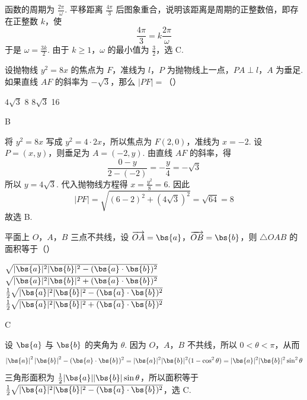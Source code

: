 \begin{solution}
函数的周期为 \(\frac{2\pi}{\omega}\). 平移距离 \(\frac{4\pi}{3}\) 后图象重合，说明该距离是周期的正整数倍，即存在正整数 \(k\)，使
\[
\frac{4\pi}{3}=k\frac{2\pi}{\omega}
\]
于是 \(\omega=\frac{3k}{2}\). 由于 \(k\geqslant1\)，\(\omega\) 的最小值为 \(\frac{3}{2}\)，选 C.
\end{solution}

\begin{problem}
设抛物线 \(y^2=8x\) 的焦点为 \(F\)，准线为 \(l\)，\(P\) 为抛物线上一点，\(PA\perp l\)，\(A\) 为垂足. 如果直线 \(AF\) 的斜率为 \(-\sqrt{3}\)，那么 \(|PF|=\)（\quad）

\choices
    {\(4\sqrt{3}\)}
    {8}
    {\(8\sqrt{3}\)}
    {16}
\end{problem}

\begin{answer}
B
\end{answer}

\begin{solution}
将 \(y^2=8x\) 写成 \(y^2=4\cdot2x\)，所以焦点为 \(F(2,0)\)，准线为 \(x=-2\). 设 \(P=(x,y)\)，则垂足为 \(A=(-2,y)\). 由直线 \(AF\) 的斜率，得
\[
\frac{0-y}{2-(-2)}=-\frac{y}{4}=-\sqrt{3}
\]
所以 \(y=4\sqrt{3}\). 代入抛物线方程得 \(x=\frac{y^2}{8}=6\). 因此
\[
|PF|=\sqrt{(6-2)^2+(4\sqrt{3})^2}=\sqrt{64}=8
\]
故选 B.
\end{solution}

\begin{problem}
平面上 \(O\)，\(A\)，\(B\) 三点不共线，设 \(\overrightarrow{OA}=\bs{a}\)，\(\overrightarrow{OB}=\bs{b}\)，则 \(\triangle OAB\) 的面积等于（\quad）

\choices
    {\(\sqrt{|\bs{a}|^2|\bs{b}|^2-(\bs{a}\cdot\bs{b})^2}\)}
    {\(\sqrt{|\bs{a}|^2|\bs{b}|^2+(\bs{a}\cdot\bs{b})^2}\)}
    {\(\frac{1}{2}\sqrt{|\bs{a}|^2|\bs{b}|^2-(\bs{a}\cdot\bs{b})^2}\)}
    {\(\frac{1}{2}\sqrt{|\bs{a}|^2|\bs{b}|^2+(\bs{a}\cdot\bs{b})^2}\)}
\end{problem}

\begin{answer}
C
\end{answer}

\begin{solution}
设 \(\bs{a}\) 与 \(\bs{b}\) 的夹角为 \(\theta\). 因为 \(O\)，\(A\)，\(B\) 不共线，所以 \(0<\theta<\pi\)，从而
\[
\left|\bs{a}\right|^2\left|\bs{b}\right|^2-(\bs{a}\cdot\bs{b})^2
=|\bs{a}|^2|\bs{b}|^2(1-\cos^2\theta)
=|\bs{a}|^2|\bs{b}|^2\sin^2\theta
\]
三角形面积为 \(\frac{1}{2}|\bs{a}||\bs{b}|\sin\theta\)，所以面积等于
\(\frac{1}{2}\sqrt{|\bs{a}|^2|\bs{b}|^2-(\bs{a}\cdot\bs{b})^2}\)，选 C.
\end{solution}

